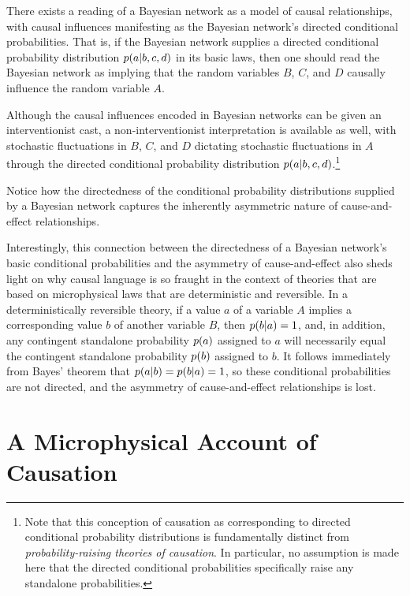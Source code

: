 \documentclass[twoside,twocolumn,english,prl,superscriptaddress,nobibnotes,nofootinbib]{revtex4-2}
\let\originalleft\left
\let\originalright\right
\renewcommand{\left}{\mathopen{}\mathclose\bgroup\originalleft}
\renewcommand{\right}{\aftergroup\egroup\originalright}
\begin{document}
There exists a reading of a Bayesian network as a model of causal
relationships, with causal influences manifesting as the Bayesian
network's directed conditional probabilities. That is, if the Bayesian
network supplies a directed conditional probability distribution $p\left(a\given b,c,d\right)$
in its basic laws, then one should read the Bayesian network as implying
that the random variables $B$, $C$, and $D$ causally influence
the random variable $A$.

Although the causal influences encoded in Bayesian networks can be
given an interventionist cast, a non-interventionist interpretation
is available as well, with stochastic fluctuations in $B$, $C$,
and $D$ dictating stochastic fluctuations in $A$ through the directed
conditional probability distribution $p\left(a\given b,c,d\right)$.\footnote{Note that this conception of causation as corresponding to directed
conditional probability distributions is fundamentally distinct from
\emph{probability-raising theories of causation}. In particular,
no assumption is made here that the directed conditional probabilities
specifically raise any standalone probabilities.}

Notice how the directedness of the conditional probability distributions
supplied by a Bayesian network captures the inherently asymmetric
nature of cause-and-effect relationships.

Interestingly, this connection between the directedness of a Bayesian
network's basic conditional probabilities and the asymmetry of cause-and-effect
also sheds light on why causal language is so fraught in the context
of theories that are based on microphysical laws that are deterministic
and reversible. In a deterministically reversible theory, if a value
$a$ of a variable $A$ implies a corresponding value $b$ of another
variable $B$, then $p\left(b\given a\right)=1$, and, in addition,
any contingent standalone probability $p\left(a\right)$ assigned
to $a$ will necessarily equal the contingent standalone probability
$p\left(b\right)$ assigned to $b$. It follows immediately from Bayes'
theorem that $p\left(a\given b\right)=p\left(b\given a\right)=1$,
so these conditional probabilities are not directed, and the asymmetry
of cause-and-effect relationships is lost.

\section{A Microphysical Account of Causation\label{sec:A-Microphysical-Account-of-Causation}}
\end{document}
